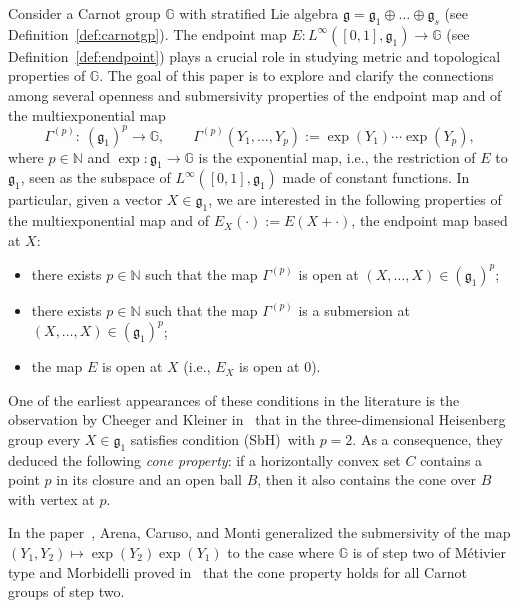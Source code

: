 \documentclass[pdftex]{sigma}
\numberwithin{equation}{section}
\theoremstyle{definition}
\begin{document}
Consider a Carnot group $\mathbb{G}$ with stratified Lie algebra ${\mathfrak g}={\mathfrak g}_1\oplus \dots \oplus {\mathfrak g}_s$ (see Definition~\ref{def:carnotgp}).
The endpoint map $E\colon L^\infty([0,1],{\mathfrak g}_1)\to \mathbb{G}$ (see Definition~\ref{def:endpoint})
 plays a crucial role in studying
metric and topological properties of $\mathbb{G}$. The goal of this paper is to explore and clarify the connections among several openness and submersivity properties of the endpoint map and of the multiexponential map
\begin{equation*} %
 \Gamma^{(p)}\colon \ ({\mathfrak g}_1)^p\to\mathbb{G}, \qquad \Gamma^{(p)}(Y_1,\dots,Y_p):=\exp(Y_{1})\cdots \exp(Y_{p}),
\end{equation*}
where $p\in \mathbb{N}$ and $\exp\colon {\mathfrak g}_1\to\mathbb{G}$ is the exponential map, i.e., the restriction of $E$ to ${\mathfrak g}_1$, seen as the subspace of $L^\infty([0,1],{\mathfrak g}_1)$ made of constant functions. In particular, given a vector $X\in{\mathfrak g}_1$, we are interested in the following properties of the multiexponential map and of $E_X(\cdot):=E(X+\cdot)$, the endpoint map based at $X$:
\begin{itemize}\itemsep=0pt\setlength{\leftskip}{0.22cm}
 \item[(H)] there exists $p\in\mathbb{N}$ such that the map $\Gamma^{(p)}$ is open at $(X,\dots,X)\in({\mathfrak g}_1)^p$;
 \item[(SbH)] there exists $p\in\mathbb{N}$ such that the map $\Gamma^{(p)}$ is a submersion at $(X,\dots,X)\in({\mathfrak g}_1)^p$;
 \item[(P)] the map $E$ is open at $X$ (i.e., $E_X$ is open at 0).
\end{itemize}

One of the earliest appearances of these conditions in the literature is the
observation by Cheeger and Kleiner in~\cite{CheegerKleiner} that in the three-dimensional Heisenberg group every $X\in {\mathfrak g}_1$ satisfies
condition (SbH)\ with $p=2$. As a consequence, they deduced the following \emph{cone property}: if a horizontally convex set $C$ contains a point $p$ in its closure and an open ball $B$, then it also contains
the cone over $B$ with vertex at $p$.

In the paper~\cite{ACM}, Arena, Caruso, and Monti generalized the submersivity of the map $(Y_1,Y_2)\mapsto \exp(Y_2) \exp(Y_1)$ to the case where $\mathbb{G}$ is of step two of M\'etivier type and
Morbidelli proved in~\cite{Morbidelli} that the cone property holds for all Carnot groups of step two.
\end{document}
